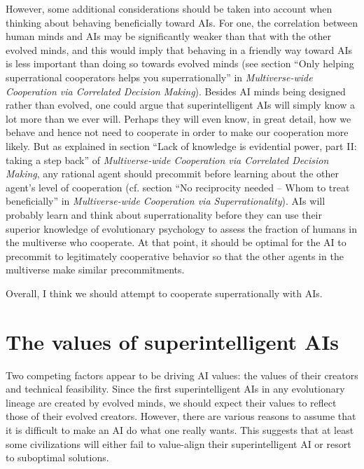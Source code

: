 \documentclass[]{article}
\begin{document}
However, some additional considerations should be taken into account
when thinking about behaving beneficially toward AIs. For one, the
correlation between human minds and AIs may be significantly weaker than
that with the other evolved minds, and this would imply that behaving in
a friendly way toward AIs is less important than doing so towards
evolved minds (see section ``Only helping superrational cooperators
helps you superrationally'' in \emph{Multiverse-wide Cooperation via
Correlated Decision Making}).
Besides AI minds being designed rather than evolved, one could argue that superintelligent AIs will
simply know a lot more than we ever will. Perhaps they will even know,
in great detail, how we behave and hence not need to cooperate in order
to make our cooperation more likely. But as explained in section
``Lack
of knowledge is evidential power, part II: taking a step back'' of
\emph{Multiverse-wide Cooperation via Correlated Decision Making}, 
any rational
agent should precommit before learning about the other agent's level of
cooperation (cf. section
``No reciprocity needed -- Whom to treat
beneficially'' in \emph{Multiverse-wide Cooperation
via Superrationality}).
AIs will probably learn and think about superrationality before they can use their superior knowledge of
evolutionary psychology to assess the fraction of humans in the
multiverse who cooperate. At that point, it should be optimal for the AI
to precommit to legitimately cooperative behavior so that the other
agents in the multiverse make similar precommitments.

Overall, I think we should attempt to cooperate superrationally with
AIs.

\section{The values of superintelligent AIs}
\label{the-values-of-superintelligent-ais}

Two competing factors appear to be driving AI values: the values of
their creators and technical feasibility. Since the first
superintelligent AIs in any evolutionary lineage are created by evolved
minds, we should expect their values to reflect those of their evolved
creators. However, there are various reasons to assume that it is
difficult to make an AI do what one really wants. This suggests that at
least some civilizations will either fail to value-align their
superintelligent AI or resort to suboptimal solutions.
\end{document}
